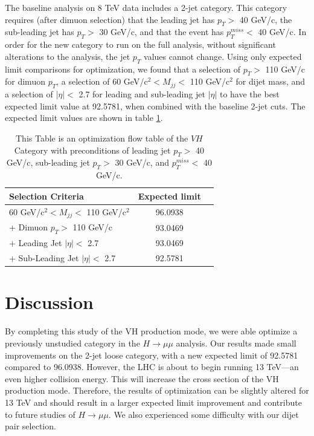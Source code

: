 \documentclass[12pt]{article}
\begin{document}
The baseline analysis on 8 TeV data includes a 2-jet category. This category requires (after dimuon selection) 
that the leading jet has $p_{T} >$ 40 GeV/c, the sub-leading jet has $p_{T} >$ 30 GeV/c, and that the event has $p_{T}^{miss} <$ 40 GeV/c. 
In order for the new category to run
on the full analysis, without significant alterations to the analysis, the jet $p_{T}$ values cannot change. Using only expected limit comparisons for 
optimization, we found that a selection of $p_{T}>$ 110 GeV/c for dimuon $p_{T}$, 
a selection of 60 GeV/c$^{2}< M_{jj}<$ 110 GeV/c$^{2}$ for dijet mass, and a selection of $|\eta|<$ 2.7 for leading and sub-leading 
jet $|\eta|$ to have the best expected limit value at 92.5781, when combined with the baseline 2-jet cuts. 
The expected limit values are shown in table \ref{tab:ExpectedLimits}.

\begin{table}[!hbtp]
  \begin{center}
    \caption{ \label{tab:ExpectedLimits}
        This Table is an optimization flow table of the $VH$ Category with preconditions of leading jet $p_{T} >$ 40
	GeV/c, sub-leading jet $p_{T} >$ 30 GeV/c, and $p_{T}^{miss} <$ 40 GeV/c.
    }
    \begin{tabular}{lcc} \hline \hline
         Selection Criteria & Expected limit \\ \hline
         60 GeV/c$^{2} < M_{jj} <$ 110 GeV/c$^{2}$ & 96.0938  \\
         + Dimuon $p_{T} >$ 110 GeV/c & 93.0469 \\
	 + Leading Jet $|\eta| <$ 2.7 & 93.0469 \\
	 + Sub-Leading Jet $|\eta| <$ 2.7 & 92.5781 \\
     \hline \hline
    \end{tabular}
  \end{center}
\end{table}

\section{Discussion}

By completing this study of the VH production mode, we were able optimize a previously unstudied category in the $H\rightarrow \mu\mu$ analysis.
Our results made small improvements on the 2-jet loose category, with a new expected limit of 92.5781 compared to 96.0938.
However, the LHC is about to begin running 13 TeV---an even higher collision energy. 
This will increase the cross section of the VH production mode. 
Therefore, the results of optimization can be slightly altered for 13 TeV and should result in a larger 
expected limit improvement and contribute to future studies of $H\rightarrow\mu\mu$.
We also experienced some difficulty with our dijet pair selection.
\end{document}
